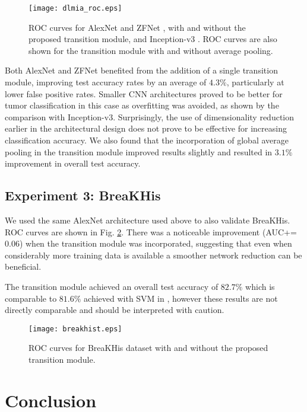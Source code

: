 \documentclass[runningheads,a4paper]{llncs}
\begin{document}
\begin{figure}[t]
	\centering
	\texttt{[image: dlmia\_roc.eps]}
	\caption{ROC curves for AlexNet \cite{Krizhevsky2012} and ZFNet \cite{Zeiler2013}, with and without the proposed transition module, and Inception-v3 \cite{Szegedy2016}. ROC curves are also shown for the transition module with and without average pooling.}
	\label{fig:roc}
\end{figure}



Both AlexNet and ZFNet benefited from the addition of a single transition module, improving test accuracy rates by an average of $4.3\%$, particularly at lower false positive rates. Smaller CNN architectures proved to be better for tumor classification in this case as overfitting was avoided, as shown by the comparison with Inception-v3. Surprisingly, the use of dimensionality reduction earlier in the architectural design does not prove to be effective for increasing classification accuracy.
We also found that the incorporation of global average pooling in the transition module improved results slightly and resulted in $3.1\%$ improvement in overall test accuracy. 


\subsection{Experiment 3: BreaKHis}
\label{sec:breakhist}

We used the same AlexNet architecture used above to also validate BreaKHis. ROC curves are shown in Fig. \ref{fig:breakhist_roc}. There was a noticeable improvement (AUC+=$0.06$) when the transition module was incorporated, suggesting that even when considerably more training data is available a smoother network reduction can be beneficial.

The transition module achieved an overall test accuracy of $82.7\%$ which is comparable to $81.6\%$ achieved with SVM in \cite{Spanhol2016b}, however these results are not directly comparable and should be interpreted with caution.

\begin{figure}[t]
	\centering
	\texttt{[image: breakhist.eps]}
	\caption{ROC curves for BreaKHis \cite{Spanhol2016b} dataset with and without the proposed transition module.}
	\label{fig:breakhist_roc}
\end{figure}


\section{Conclusion}
\end{document}
